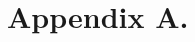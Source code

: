 \documentclass[twoside,11pt]{article}
\begin{document}









\newpage

\appendix
\section*{Appendix A.}


\label{app:theorem}






\vskip 0.2in

\end{document}
